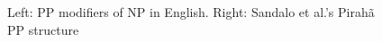 \documentclass[output=paper,colorlinks,citecolor=brown
]{langscibook}
\begin{document}
\begin{figure}
    \centering
\hspace*{1.5em}
\hspace*{2em}
    \caption{Left: PP modifiers of NP in English. Right:  Sandalo et al.'s Pirah{\~a} PP structure}
    \label{fig:pullum:1}
\end{figure}
\end{document}
